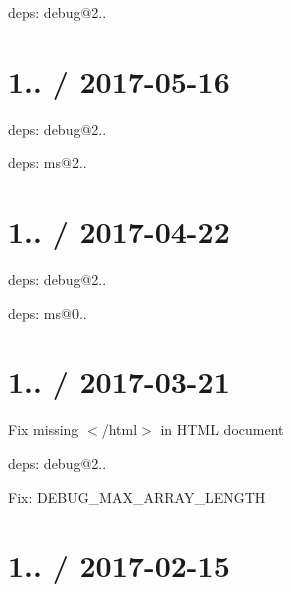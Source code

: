 \begin{DoxyItemize}
\item deps\+: debug@2..
\end{DoxyItemize}

\section*{1.. / 2017-\/05-\/16 }


\begin{DoxyItemize}
\item deps\+: debug@2..
\begin{DoxyItemize}
\item deps\+: ms@2..
\end{DoxyItemize}
\end{DoxyItemize}

\section*{1.. / 2017-\/04-\/22 }


\begin{DoxyItemize}
\item deps\+: debug@2..
\begin{DoxyItemize}
\item deps\+: ms@0..
\end{DoxyItemize}
\end{DoxyItemize}

\section*{1.. / 2017-\/03-\/21 }


\begin{DoxyItemize}
\item Fix missing {\ttfamily $<$/html$>$} in H\+T\+ML document
\item deps\+: debug@2..
\begin{DoxyItemize}
\item Fix\+: {\ttfamily D\+E\+B\+U\+G\+\_\+\+M\+A\+X\+\_\+\+A\+R\+R\+A\+Y\+\_\+\+L\+E\+N\+G\+TH}
\end{DoxyItemize}
\end{DoxyItemize}

\section*{1.. / 2017-\/02-\/15 }


